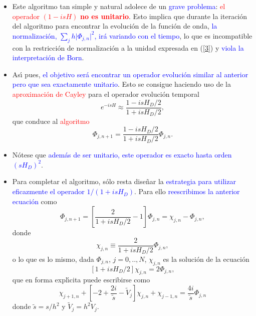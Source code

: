 \documentclass[12pt,spanish]{iopart}
\def\az{\textcolor{blue}}
\def\ro{\textcolor{red}}
\begin{document}
\begin{itemize}
\item Este algoritmo tan simple y natural adolece de un \az{grave problema}: \ro{el operador 
$(1-isH)$ {\bf no es unitario}}. Esto implica que durante la iteraci{\'o}n del algoritmo para encontrar la evoluci{\'o}n de la 
funci{\'o}n de onda,  \az{la normalizaci{\'o}n, $\sum_j h \vert\Phi_{j,n}\vert^2$, ir{\'a} variando con el tiempo}, lo que es incompatible
con la restricci\'on de normalizaci\'on a la unidad expresada en (\ref{3}) y \az{viola la interpretaci\'on de Born}.

\item As\'{\i} pues, \az{el objetivo ser{\'a} encontrar un operador evoluci{\'o}n similar al anterior pero que sea exactamente unitario}. Esto
se  consigue haciendo uso de la \ro{aproximaci\'on de Cayley} para el operador evoluci\'on temporal
%
\begin{equation}
e^{-isH}\approx \frac{1-isH_D/2}{1+isH_D/2},
\end{equation}
%
que conduce  al  \ro{algoritmo}
%
\begin{equation}
\Phi_{j,n+1}=\frac{1-isH_D/2}{1+isH_D/2}\Phi_{j,n}.
\end{equation}
%

\item N\'otese que \az{adem{\'a}s de ser unitario, este operador es exacto hasta orden $(sH_D)^2$}.

\item Para completar el algoritmo, s\'olo resta dise{\~n}ar la \az{estrategia para  utilizar eficazmente el operador $1/(1+isH_D)$}.
Para ello \az{reescribimos la anterior ecuaci{\'o}n} como
%
\begin{equation}
\label{evol}
\Phi_{j,n+1}=\left[ \frac{2}{1+isH_D/2} -1 \right]\Phi_{j,n}=\chi_{j,n}-\Phi_{j,n},
\end{equation}
%
donde
%
\begin{equation}
\chi_{j,n}\equiv \frac{2}{1+isH_D/2}\Phi_{j,n},
\end{equation}
%
o lo que es lo mismo, dada $\Phi_{j,n}$, $j=0,..,N$, $\chi_{j,n}$ es la soluci{\'o}n de la ecuaci{\'o}n
%
\begin{equation}
\left[ 1+isH_D/2  \right]\chi_{j,n}=2\Phi_{j,n},
\end{equation}
%
que en forma expl{\'\i}cita puede escribirse como
%
\begin{equation}
\chi_{j+1,n}+\left[-2+\frac{2i}{\tilde s}-\tilde V_j \right]\chi_{j,n}+\chi_{j-1,n}=\frac{4i}{\tilde s}\Phi_{j,n}
\label{kappa}
\end{equation}
%
donde $\tilde s=s/h^2$ y $\tilde V_j=h^2V_j$.


\end{itemize}
\end{document}
